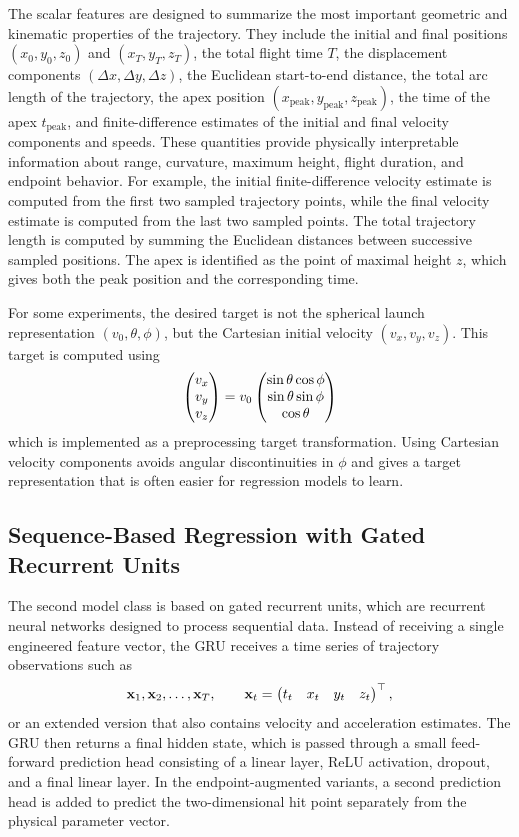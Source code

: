 The scalar features are designed to summarize the most important geometric and kinematic properties of the trajectory.
They include the initial and final positions $(x_0,y_0,z_0)$ and $(x_T,y_T,z_T)$, the total flight time $T$, the displacement components $(\Delta x,\Delta y,\Delta z)$, the Euclidean start-to-end distance, the total arc length of the trajectory, the apex position $(x_{\mathrm{peak}},y_{\mathrm{peak}},z_{\mathrm{peak}})$, the time of the apex $t_{\mathrm{peak}}$, and finite-difference estimates of the initial and final velocity components and speeds.
These quantities provide physically interpretable information about range, curvature, maximum height, flight duration, and endpoint behavior.
For example, the initial finite-difference velocity estimate is computed from the first two sampled trajectory points, while the final velocity estimate is computed from the last two sampled points.
The total trajectory length is computed by summing the Euclidean distances between successive sampled positions.
The apex is identified as the point of maximal height $z$, which gives both the peak position and the corresponding time.

For some experiments, the desired target is not the spherical launch representation $(v_0,\theta,\phi)$, but the Cartesian initial velocity $(v_x,v_y,v_z)$.
This target is computed using
\begin{equation*}
    \pmqty{v_x\\v_y\\v_z} = v_0\pmqty{\sin\theta\cos\phi\\\sin\theta\sin\phi\\\cos\theta}
\end{equation*}
which is implemented as a preprocessing target transformation.
Using Cartesian velocity components avoids angular discontinuities in $\phi$ and gives a target representation that is often easier for regression models to learn.

\subsection{Sequence-Based Regression with Gated Recurrent Units}

The second model class is based on gated recurrent units, which are recurrent neural networks designed to process sequential data.
Instead of receiving a single engineered feature vector, the GRU receives a time series of trajectory observations such as
\begin{equation*}
    \vb{x}_1,\vb{x}_2,\dots,\vb{x}_T, \qquad \vb{x}_t = \begin{pmatrix}
        t_t & x_t & y_t & z_t
    \end{pmatrix}^{\top},
\end{equation*}
or an extended version that also contains velocity and acceleration estimates.
The GRU then returns a final hidden state, which is passed through a small feed-forward prediction head consisting of a linear layer, ReLU activation, dropout, and a final linear layer.
In the endpoint-augmented variants, a second prediction head is added to predict the two-dimensional hit point separately from the physical parameter vector.

